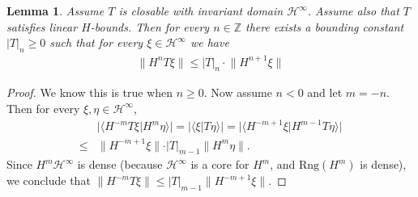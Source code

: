 \documentclass[12pt,b5paper,notitlepage]{article}
\theoremstyle{definition}
\theoremstyle{plain}
\newtheorem{lm}[df]{Lemma}
\newcommand{\mc}{\mathcal}
\newcommand{\ovl}{\overline}
\newcommand{\Dom}{\scr{D}}
\newcommand{\bk}[1]{\langle {#1}\rangle}
\newcommand{\scr}{\mathscr}
\newcommand{\Nbb}{\mathbb N}
\newcommand{\Zbb}{\mathbb Z}
\newcommand{\Rng}{\mathrm{Rng}}
\numberwithin{equation}{section}
\begin{document}
\begin{comment}
\begin{lm}
Choose $n\in\Nbb$. Assume \eqref{eqa7} holds for all $\xi\in\mc H^\infty$. Then
\begin{align*}
\Dom(H^{n+r})\subset\Dom(\ovl T)\qquad	 \ovl T\Dom(H^{n+r})\subset \Dom(H^n)
\end{align*}
and \eqref{eqa7} holds for all $\xi\in\Dom(H^{n+r})$ if $T$ is replaced by $\ovl T$.
\end{lm}


\begin{proof}
Let $\xi\in\Dom(H^{n+r})\subset\Dom(H^r)$. Choose $\xi_k=\chi_{(-k,k)}(H)\xi$, which is in $\mc H^\infty$. Since $H^r\xi_k$ converges to $H^r\xi$, by \eqref{eqa7} (where $n=0$), $T\xi_k$ is a Cauchy sequence. So, since $\xi_k\rightarrow \xi$, we conclude $\xi\in\Dom(\ovl T)$ and $T\xi_k\rightarrow\ovl T\xi$. 

Similarly, since $H^{n+r}\xi_k\rightarrow H^{n+r}\xi$, by \eqref{eqa7}, we conclude that $H^nT\xi_k$ converges to a vector whose norm is bounded by $|T|_n\lVert H^{n+r}\xi\lVert$. Thus, because $T\xi_k\rightarrow \ovl T\xi$, we have $\ovl T\xi\in\Dom(H^n)$ and $H^n\ovl T\xi$ has norm bounded by $|T|_n\lVert H^{n+r}\xi\lVert$.
\end{proof}
\end{comment}



\begin{lm}\label{lba7}
Assume $T$ is closable with invariant  domain $\mc H^\infty$. Assume also that $T$ satisfies linear $H$-bounds. Then for every $n\in\Zbb$ there exists a bounding constant $|T|_n\geq 0$ such that for every $\xi\in\mc H^\infty$ we have
\begin{align*}
\lVert H^nT\xi\lVert\leq |T|_n\cdot \lVert H^{n+1}\xi\lVert	
\end{align*}
\end{lm}

\begin{proof}
We know this is true when $n\geq 0$. Now assume $n<0$ and let $m=-n$. Then for every $\xi,\eta\in\mc H^\infty$,
\begin{align*}
&\big|\bk{H^{-m}T\xi|H^m\eta} \big|=\big|\bk{\xi|T\eta} \big|	=\big|\bk{H^{-m+1}\xi|H^{m-1}T\eta}  \big|\\
\leq&	\lVert H^{-m+1}\xi\lVert\cdot |T|_{m-1}\lVert H^m\eta\lVert.	
\end{align*}
Since $H^m\mc H^\infty$ is dense (because $\mc H^\infty$ is a core for $H^m$, and $\Rng(H^m)$ is dense), we conclude that $\lVert H^{-m}T\xi\lVert\leq |T|_{m-1}\lVert H^{-m+1}\xi\lVert$. 
\end{proof}
\end{document}
